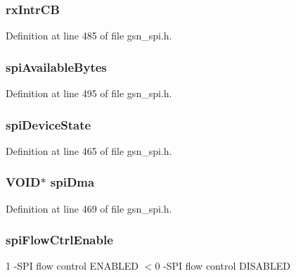 \hypertarget{a00230_a764a17416df305e000c7f2c5d3edf2c2}{
\subsubsection[{rxIntrCB}]{ {\bf rxIntrCB}}}
\label{a00230_a764a17416df305e000c7f2c5d3edf2c2}


Definition at line 485 of file gsn\_\-spi.h.

\hypertarget{a00230_aeb856d40bd458a2626a852d943ac6011}{
\subsubsection[{spiAvailableBytes}]{ {\bf spiAvailableBytes}}}
\label{a00230_aeb856d40bd458a2626a852d943ac6011}


Definition at line 495 of file gsn\_\-spi.h.

\hypertarget{a00230_a4c476950e1b6c17d70082d31569f567b}{
\subsubsection[{spiDeviceState}]{ {\bf spiDeviceState}}}
\label{a00230_a4c476950e1b6c17d70082d31569f567b}


Definition at line 465 of file gsn\_\-spi.h.

\hypertarget{a00230_ab08af989c36bfccd7ef415ab4723fec7}{
\subsubsection[{spiDma}]{\setlength{\rightskip}{0pt plus 5cm}VOID$\ast$ {\bf spiDma}}}
\label{a00230_ab08af989c36bfccd7ef415ab4723fec7}


Definition at line 469 of file gsn\_\-spi.h.

\hypertarget{a00230_a1bc4a98bab8dbbd5b534535948c82885}{
\subsubsection[{spiFlowCtrlEnable}]{ {\bf spiFlowCtrlEnable}}}
\label{a00230_a1bc4a98bab8dbbd5b534535948c82885}
1 -\/SPI flow control ENABLED $<$0 -\/SPI flow control DISABLED 

